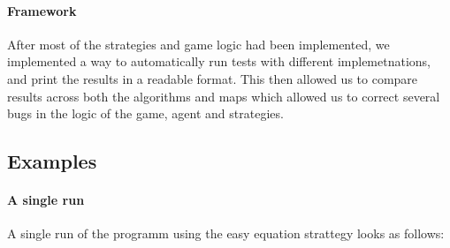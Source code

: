 \documentclass[british]{article}
\begin{document}
\paragraph{Framework} After most of the strategies and game logic had been implemented, we implemented a way to automatically run tests with different implemetnations, and print the results in a readable format. This then allowed us to compare results across both the algorithms and maps which allowed us to correct several bugs in the logic of the game, agent and strategies. 

\subsection{Examples}
\label{example}
\paragraph{A single run} A single run of the programm using the easy equation strattegy looks as follows:
\end{document}
